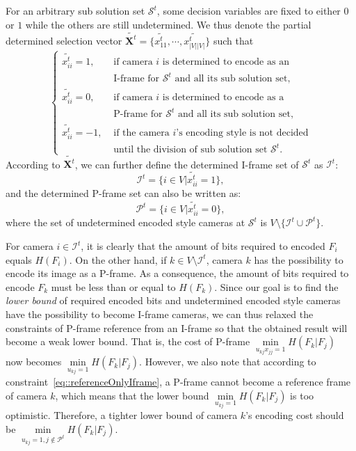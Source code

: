 For an arbitrary sub solution set $\mathcal{S}^t$, some decision variables are fixed to either $0$ or $1$ while the others are still undetermined.
We thus denote the partial determined selection vector ${\tilde{\mathbf{X}^t} = \{ \tilde{x_{11}^t},\cdots, \tilde{x_{|V||V|}^t} \} }$ such that
\begin{equation*}
\left\{ \begin{array}{ll}
\tilde{x_{ii}^t} = 1,  &\text{ if camera $i$ is determined to encode as an} \\
                   	   &\text{ I-frame for $\mathcal{S}^t$ and all its sub solution set,} \\
\tilde{x_{ii}^t} = 0,  &\text{ if camera $i$ is determined to encode as a} \\
                   	   &\text{ P-frame for $\mathcal{S}^t$ and all its sub solution set,} \\
\tilde{x_{ii}^t} = -1, &\text{ if the camera $i$'s encoding style is not decided} \\
                       &\text{ until the division of sub solution set $\mathcal{S}^t$.}
\end{array} \right.
\end{equation*}
%
According to $\tilde{\mathbf{X}^t}$, we can further define the determined I-frame set of $\mathcal{S}^t$ as $\mathcal{I}^t$:
\begin{equation}
\mathcal{I}^t = \{ i \in V | \tilde{x_{ii}^t} = 1 \},
\label{eq::IframeSet}
\end{equation}
and the determined P-frame set can also be written as:
\begin{equation}
\mathcal{P}^t = \{ i \in V | \tilde{x_{ii}^t} = 0 \},
\label{eq::PframeSet}
\end{equation}
where the set of undetermined encoded style cameras at $\mathcal{S}^t$ is $V \setminus \{ \mathcal{I}^t \cup \mathcal{P}^t \}$.

For camera $i \in \mathcal{I}^t$, it is clearly that the amount of bits required to encoded $F_i$ equals $H(F_i)$.
On the other hand, if $k \in V \setminus \mathcal{I}^t$, camera $k$ has the possibility to encode its image as a P-frame.
As a consequence, the amount of bits required to encode $F_k$ must be less than or equal to $H(F_k)$.
Since our goal is to find the \emph{lower bound} of required encoded bits and undetermined encoded style cameras have the possibility to become I-frame cameras, we can thus relaxed the constraints of P-frame reference from an I-frame so that the obtained result will become a weak lower bound.
That is, the cost of P-frame $\underset{u_{kj}x_{jj}=1}{\min} H(F_k|F_j)$ now becomes $\underset{u_{kj}=1}{\min} H(F_k|F_j)$.
However, we also note that according to constraint~\eqref{eq::referenceOnlyIframe}, a P-frame cannot become a reference frame of camera $k$, which means that the lower bound $\underset{u_{kj}=1}{\min} H(F_k|F_j)$ is too optimistic.
Therefore, a tighter lower bound of camera $k$'s encoding cost should be $\underset{u_{kj}=1, j \notin \mathcal{P}^t}{\min} H(F_k|F_j)$.
%

